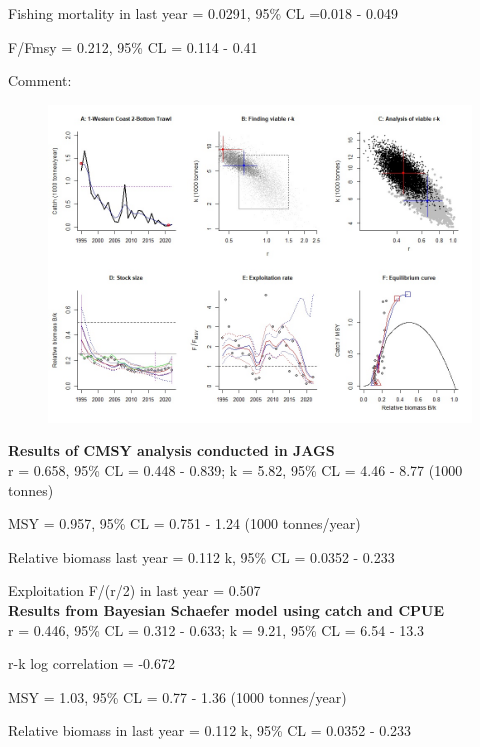 \documentclass[12pt,a4paper]{article}\usepackage[]{graphicx}\usepackage[]{xcolor}
\begin{document}
Fishing mortality in last year = 0.0291, 95\% CL =0.018 - 0.049

F/Fmsy  = 0.212, 95\% CL = 0.114 - 0.41 

 Comment:  

    \pagebreak

    \begin{figure}[ht]
    \centering
    \includegraphics[width=1.00\textwidth ext=.jpg type=jpg]{1-Western Coast 2-Bottom Trawl_AN.jpg}
    \end{figure}

    \textbf{Results of CMSY analysis conducted in JAGS}\\

r = 0.658, 95\% CL = 0.448 - 0.839; k = 5.82, 95\% CL = 4.46 - 8.77 (1000 tonnes)

MSY = 0.957, 95\% CL = 0.751 - 1.24 (1000 tonnes/year)

Relative biomass last year = 0.112 k, 95\% CL = 0.0352 - 0.233

Exploitation F/(r/2) in last year = 0.507 \\

\textbf{Results from Bayesian Schaefer model using catch and CPUE}\\

r = 0.446, 95\% CL = 0.312 - 0.633; k = 9.21, 95\% CL = 6.54 - 13.3

r-k log correlation = -0.672

MSY = 1.03, 95\% CL = 0.77 - 1.36 (1000 tonnes/year)

Relative biomass in last year = 0.112 k, 95\% CL = 0.0352 - 0.233
\end{document}
